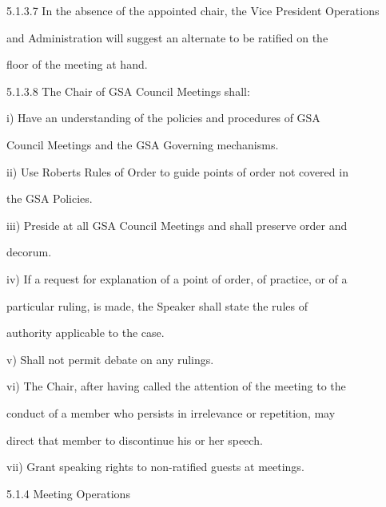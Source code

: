   

5.1.3.7   In the absence of the appointed chair, the Vice President Operations  

             and  Administration  will  suggest  an  alternate  to  be  ratified  on  the  

             floor of the meeting at hand.   

  

5.1.3.8   The Chair of GSA Council Meetings shall:   

  

     i)       Have  an  understanding  of  the  policies  and  procedures  of  GSA  

              Council Meetings and the GSA Governing mechanisms.   

  

     ii)      Use Roberts Rules of Order to guide points of order not covered in  

              the GSA Policies.   

  

     iii)     Preside at all  GSA  Council Meetings and shall preserve order and  

              decorum.   

  

     iv)      If a request for explanation of a point of order, of practice, or of a  

              particular  ruling,  is  made,  the  Speaker  shall  state  the  rules  of  

              authority applicable to the case.   

  

     v)        Shall not permit debate on any rulings.   

  

     vi)      The  Chair,  after having called the attention of the meeting to the  

              conduct of a member who persists in irrelevance or repetition, may  

              direct that member to discontinue his or her speech.   

  

     vii)     Grant speaking rights to non-ratified guests at meetings.  

                                                            

                                     5.1.4        Meeting Operations  

